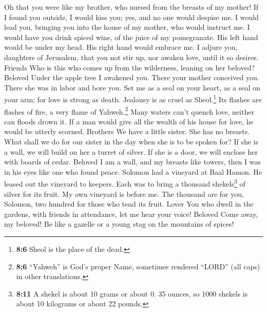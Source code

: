  Oh that you were like my brother, who nursed from the
breasts of my mother! If I found you outside, I would kiss you; yes, and
no one would despise me.  I would lead you, bringing you
into the house of my mother, who would instruct me. I would have you
drink spiced wine, of the juice of my pomegranate.  His
left hand would be under my head. His right hand would embrace me.
 I adjure you, daughters of Jerusalem, that you not stir
up, nor awaken love, until it so desires. Friends  Who is
this who comes up from the wilderness, leaning on her beloved? Beloved
Under the apple tree I awakened you. There your mother conceived you.
There she was in labor and bore you.  Set me as a seal on
your heart, as a seal on your arm; for love is strong as death. Jealousy
is as cruel as Sheol.\footnote{\textbf{8:6} Sheol is the place of the
  dead.} Its flashes are flashes of fire, a very flame of
Yahweh.\footnote{\textbf{8:6} ``Yahweh'' is God's proper Name, sometimes
  rendered ``LORD'' (all caps) in other translations.} 
Many waters can't quench love, neither can floods drown it. If a man
would give all the wealth of his house for love, he would be utterly
scorned. Brothers  We have a little sister. She has no
breasts. What shall we do for our sister in the day when she is to be
spoken for?  If she is a wall, we will build on her a
turret of silver. If she is a door, we will enclose her with boards of
cedar. Beloved  I am a wall, and my breasts like towers,
then I was in his eyes like one who found peace.  Solomon
had a vineyard at Baal Hamon. He leased out the vineyard to keepers.
Each was to bring a thousand shekels\footnote{\textbf{8:11} A shekel is
  about 10 grams or about 0. 35 ounces, so 1000 shekels is about 10
  kilograms or about 22 pounds.} of silver for its fruit.
 My own vineyard is before me. The thousand are for you,
Solomon, two hundred for those who tend its fruit. Lover 
You who dwell in the gardens, with friends in attendance, let me hear
your voice! Beloved  Come away, my beloved! Be like a
gazelle or a young stag on the mountains of spices!
